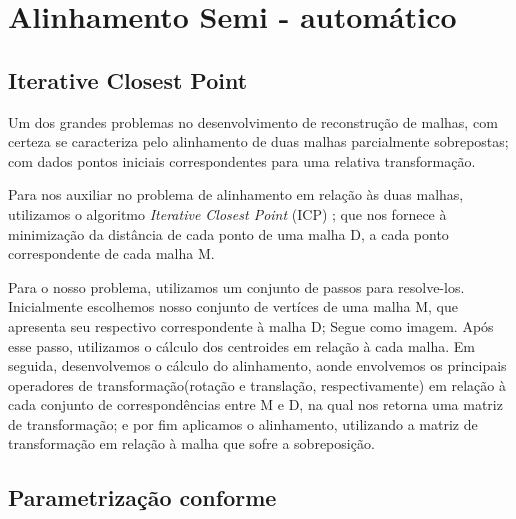 \section{Alinhamento Semi - automático}
\label{sec:technique}

\subsection{Iterative Closest Point}

Um dos grandes problemas no desenvolvimento de reconstrução de malhas, com certeza se caracteriza pelo alinhamento de duas malhas parcialmente sobrepostas; com dados pontos iniciais correspondentes para uma relativa transformação.

Para nos auxiliar no problema de alinhamento em relação às duas malhas, utilizamos o algoritmo \textit{Iterative Closest Point} (ICP) \cite{Zhang:1994}; que nos fornece à minimização da distância de cada ponto de uma malha D, a cada ponto correspondente de cada malha M.

Para o nosso problema, utilizamos um conjunto de passos para resolve-los. Inicialmente escolhemos nosso conjunto de vertíces de uma malha M, que apresenta seu respectivo correspondente à malha D; Segue  como imagem. Após esse passo, utilizamos o cálculo dos centroides em relação à cada malha. Em seguida, desenvolvemos o cálculo do alinhamento, aonde envolvemos os principais operadores de transformação(rotação e translação, respectivamente) em relação à cada conjunto de correspondências entre M e D, na qual nos retorna uma matriz de transformação; e por fim aplicamos o alinhamento, utilizando a matriz de transformação em relação à malha que sofre a sobreposição.


\subsection{Parametrização conforme}

